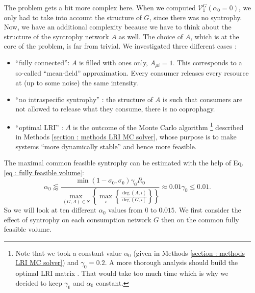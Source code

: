 \documentclass[12pt, titlepage]{report}
\begin{document}
The problem gets a bit more complex here. When we computed $\mathcal{V}^G_1(\alpha_0=0)$, we only had to take into account the structure of $G$, since there was no syntrophy. Now, we have an additional complexity because we have to think about the structure of the syntrophy network $A$ as well. The choice of $A$, which is at the core of the problem, is far from trivial. We investigated three different cases :
\begin{itemize}
  \item ``fully connected'': $A$ is filled with ones only, $A_{\mu i}=1$. This corresponds to a so-called ``mean-field'' approximation. Every consumer releases every resource at (up to some noise) the same intensity.
  \item ``no intraspecific syntrophy'' : the structure of $A$ is such that consumers are not allowed to release what they consume, \ie there is no coprophagy.
  \item ``optimal LRI'' : $A$ is the outcome of the Monte Carlo algorithm \footnote{Note that we took a constant value $\alpha_0$ (given in Methods \ref{section : methods LRI MC solver}) and $\gamma_0=0.2$. A more thorough analysis should build the optimal LRI matrix . That would take too much time which is why we decided to keep $\gamma_0$ and $\alpha_0$ constant.}
 described in Methods \ref{section : methods LRI MC solver}, whose purpose is to make systems ``more dynamically stable'' and hence more feasible.
  \end{itemize}
  The maximal common feasible syntrophy can be estimated with the help of Eq.\eqref{eq : fully feasible volume}:
  \begin{equation}
  \alpha_0 \lessapprox \frac{\min(1-\sigma_0, \sigma_0)\gamma_0 R_0}{\max_{(G,A)\in S}\left\{\max_i\left\{\frac{\deg(A,i)}{\deg(G,i)}\right\}\right\}} \approx 0.01 \gamma_0 \leq 0.01.
  \end{equation}
  So we will look at ten different $\alpha_0$ values from $0$ to $0.015$. We first consider the effect of syntrophy on each consumption network $G$ then on the common fully feasible volume.
  \FloatBarrier
\end{document}

